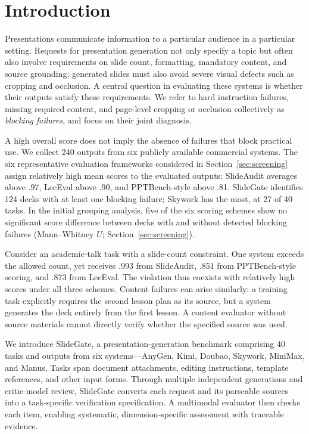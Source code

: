 \section{Introduction}
Presentations communicate information to a particular audience in a particular setting. Requests for presentation generation not only specify a topic but often also involve requirements on slide count, formatting, mandatory content, and source grounding; generated slides must also avoid severe visual defects such as cropping and occlusion. A central question in evaluating these systems is whether their outputs satisfy these requirements. We refer to hard instruction failures, missing required content, and page-level cropping or occlusion collectively as \emph{blocking failures}, and focus on their joint diagnosis.

A high overall score does not imply the absence of failures that block practical use. We collect 240 outputs from six publicly available commercial systems. The six representative evaluation frameworks considered in Section~\ref{sec:screening} assign relatively high mean scores to the evaluated outputs: SlideAudit averages above .97, LecEval above .90, and PPTBench-style above .81. SlideGate identifies 124 decks with at least one blocking failure; Skywork has the most, at 27 of 40 tasks. In the initial grouping analysis, five of the six scoring schemes show no significant score difference between decks with and without detected blocking failures (Mann--Whitney $U$; Section~\ref{sec:screening}).

Consider an academic-talk task with a slide-count constraint. One system exceeds the allowed count, yet receives .993 from SlideAudit, .851 from PPTBench-style scoring, and .873 from LecEval. The violation thus coexists with relatively high scores under all three schemes. Content failures can arise similarly: a training task explicitly requires the second lesson plan as its source, but a system generates the deck entirely from the first lesson. A content evaluator without source materials cannot directly verify whether the specified source was used.

We introduce SlideGate, a presentation-generation benchmark comprising 40 tasks and outputs from six systems---AnyGen, Kimi, Doubao, Skywork, MiniMax, and Manus. Tasks span document attachments, editing instructions, template references, and other input forms. Through multiple independent generations and critic-model review, SlideGate converts each request and its parseable sources into a task-specific verification specification. A multimodal evaluator then checks each item, enabling systematic, dimension-specific assessment with traceable evidence.

